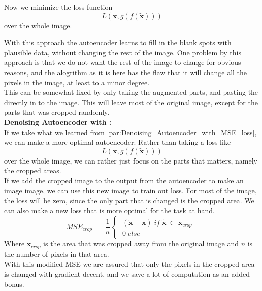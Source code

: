 	Now we minimize the loss function\\	
	  \begin{equation}
	    L(\textbf{x},g(f(\widetilde{\textbf{x}})))
	  \end{equation}
	over the whole image.\\
	\vspace{20px}
	
	With this approach the autoencoder learns to fill in the blank spots with plausible data, without changing the rest of the image. 
	One problem by this approach is that we do not want the rest of the image to change for obvious reasons, and the alogrithm as it is here has the flaw that it will change all the pixels in the image, at 
	least to a minor degree. \\
	
	This can be somewhat fixed by only taking the augmented parts, and pasting the directly in to the image. This will leave most of the original image, except for the parts that was cropped randomly.\\
	
	\vspace{10px}
	\textbf{Denoising Autoencoder with :}\\
	If we take what we learned from \ref{par:Denoising_Autoencoder_with_MSE_loss}, we can make a more optimal autoencoder:
	Rather than taking a loss like 	
	\begin{equation}
	  L(\textbf{x},g(f(\widetilde{\textbf{x}})))
	\end{equation}
	over the whole image, we can rather just focus on the parts that matters, namely the cropped areas.\\
	
	If we add the cropped image to the output from the autoencoder to make an image image, we can use this new image to train out loss.
	For most of the image, the loss will be zero, since the only part that is changed is the cropped area. 
	We can also make a new loss that is more optimal for the task at hand. 
	\begin{equation}
	  MSE_{crop}\:=\: \frac{1}{n}
	  \begin{cases}
	      \begin{array}{lcl}
	      (\widetilde{\textbf{x}}-\textbf{x}) \; if \; \widetilde{\textbf{x}} \: \in \: \textbf{x}_{crop} \\
	      0 \; else
	      \end{array}
	  \end{cases}
	\end{equation}
	Where $\textbf{x}_{crop}$ is the area that was cropped away from the original image and $n$ is the number of pixels in that area.\\
	With this modified MSE we are assured that only the pixels in the cropped area is changed with gradient decent, and we save a lot of computation as an added bonus.
	
